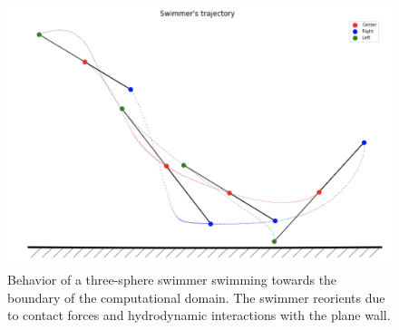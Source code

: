 \documentclass[graybox]{svmult}
\begin{document}
\begin{figure}[h!]
    \centering
    \centerline{\includegraphics[scale=0.5]{Figures/three-sphere/sw_motion2_tmp.png}}
    \caption{Behavior of a three-sphere swimmer swimming towards the boundary of 
	the computational domain. The swimmer reorients due to contact forces and hydrodynamic interactions with the plane wall.}
    \label{fig:3ss}
\end{figure}
\end{document}
